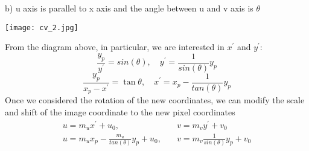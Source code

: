 \documentclass[a4paper,12pt]{article}
\begin{document}
b) u axis is parallel to x axis and the angle between u and v axis is $\theta$
\begin{center}
\texttt{[image: cv\_2.jpg]}
\end{center}
From the diagram above, in particular, we are interested in $x^\prime$ and $y^\prime$:
$$\frac{y_p}{y^\prime} = sin(\theta), \quad y^\prime= \frac{1}{sin(\theta)}y_p$$
$$\frac{y_p}{x_p - x^\prime} = \tan \theta, \quad x^\prime = x_p - \frac{1}{tan(\theta)}y_p$$
Once we considered the rotation of the new coordinates, we can modify the scale and shift of the image coordinate to the new pixel coordinates
\begin{equation}
\begin{split}
u = m_ux^\prime + u_0, \quad \quad \quad& \quad v = m_v y^\prime + v_0\\
u = m_u x_p - \frac{m_u}{tan(\theta)}y_p + u_0, & \quad v = m_v \frac{1}{sin(\theta)}y_p + v_0
\end{split}
\end{equation}
\end{document}
